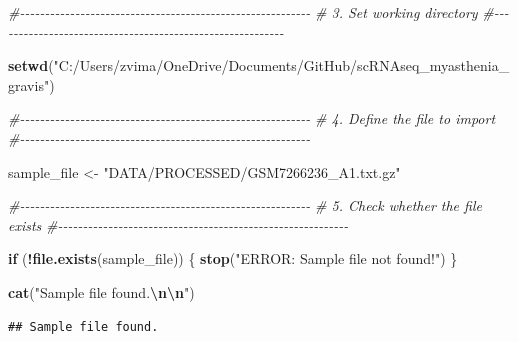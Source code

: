 \documentclass[
]{article}
\newenvironment{Shaded}{\begin{snugshade}}{\end{snugshade}}
\newcommand{\CommentTok}[1]{\textcolor[rgb]{0.56,0.35,0.01}{\textit{#1}}}
\newcommand{\ControlFlowTok}[1]{\textcolor[rgb]{0.13,0.29,0.53}{\textbf{#1}}}
\newcommand{\FunctionTok}[1]{\textcolor[rgb]{0.13,0.29,0.53}{\textbf{#1}}}
\newcommand{\NormalTok}[1]{#1}
\newcommand{\OtherTok}[1]{\textcolor[rgb]{0.56,0.35,0.01}{#1}}
\newcommand{\SpecialCharTok}[1]{\textcolor[rgb]{0.81,0.36,0.00}{\textbf{#1}}}
\newcommand{\StringTok}[1]{\textcolor[rgb]{0.31,0.60,0.02}{#1}}
\begin{document}
\begin{Shaded}
\begin{Highlighting}[]
\CommentTok{\#{-}{-}{-}{-}{-}{-}{-}{-}{-}{-}{-}{-}{-}{-}{-}{-}{-}{-}{-}{-}{-}{-}{-}{-}{-}{-}{-}{-}{-}{-}{-}{-}{-}{-}{-}{-}{-}{-}{-}{-}{-}{-}{-}{-}{-}{-}{-}{-}{-}{-}{-}{-}{-}{-}{-}{-}{-}{-}}
\CommentTok{\# 3. Set working directory}
\CommentTok{\#{-}{-}{-}{-}{-}{-}{-}{-}{-}{-}{-}{-}{-}{-}{-}{-}{-}{-}{-}{-}{-}{-}{-}{-}{-}{-}{-}{-}{-}{-}{-}{-}{-}{-}{-}{-}{-}{-}{-}{-}{-}{-}{-}{-}{-}{-}{-}{-}{-}{-}{-}{-}{-}{-}{-}{-}{-}{-}}

\FunctionTok{setwd}\NormalTok{(}\StringTok{"C:/Users/zvima/OneDrive/Documents/GitHub/scRNAseq\_myasthenia\_gravis"}\NormalTok{)}

\CommentTok{\#{-}{-}{-}{-}{-}{-}{-}{-}{-}{-}{-}{-}{-}{-}{-}{-}{-}{-}{-}{-}{-}{-}{-}{-}{-}{-}{-}{-}{-}{-}{-}{-}{-}{-}{-}{-}{-}{-}{-}{-}{-}{-}{-}{-}{-}{-}{-}{-}{-}{-}{-}{-}{-}{-}{-}{-}{-}{-}}
\CommentTok{\# 4. Define the file to import}
\CommentTok{\#{-}{-}{-}{-}{-}{-}{-}{-}{-}{-}{-}{-}{-}{-}{-}{-}{-}{-}{-}{-}{-}{-}{-}{-}{-}{-}{-}{-}{-}{-}{-}{-}{-}{-}{-}{-}{-}{-}{-}{-}{-}{-}{-}{-}{-}{-}{-}{-}{-}{-}{-}{-}{-}{-}{-}{-}{-}{-}}

\NormalTok{sample\_file }\OtherTok{\textless{}{-}} \StringTok{"DATA/PROCESSED/GSM7266236\_A1.txt.gz"}

\CommentTok{\#{-}{-}{-}{-}{-}{-}{-}{-}{-}{-}{-}{-}{-}{-}{-}{-}{-}{-}{-}{-}{-}{-}{-}{-}{-}{-}{-}{-}{-}{-}{-}{-}{-}{-}{-}{-}{-}{-}{-}{-}{-}{-}{-}{-}{-}{-}{-}{-}{-}{-}{-}{-}{-}{-}{-}{-}{-}{-}}
\CommentTok{\# 5. Check whether the file exists}
\CommentTok{\#{-}{-}{-}{-}{-}{-}{-}{-}{-}{-}{-}{-}{-}{-}{-}{-}{-}{-}{-}{-}{-}{-}{-}{-}{-}{-}{-}{-}{-}{-}{-}{-}{-}{-}{-}{-}{-}{-}{-}{-}{-}{-}{-}{-}{-}{-}{-}{-}{-}{-}{-}{-}{-}{-}{-}{-}{-}{-}}

\ControlFlowTok{if}\NormalTok{ (}\SpecialCharTok{!}\FunctionTok{file.exists}\NormalTok{(sample\_file)) \{}
  \FunctionTok{stop}\NormalTok{(}\StringTok{"ERROR: Sample file not found!"}\NormalTok{)}
\NormalTok{\}}

\FunctionTok{cat}\NormalTok{(}\StringTok{"Sample file found.}\SpecialCharTok{\textbackslash{}n\textbackslash{}n}\StringTok{"}\NormalTok{)}
\end{Highlighting}
\end{Shaded}

\begin{verbatim}
## Sample file found.
\end{verbatim}
\end{document}
